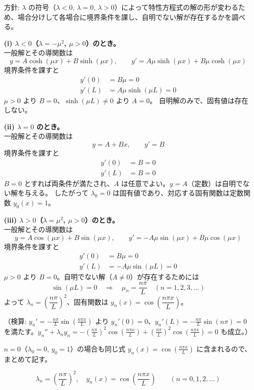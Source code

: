 
方針: $\lambda$ の符号（$\lambda < 0$, $\lambda = 0$, $\lambda > 0$）によって特性方程式の解の形が変わるため、場合分けして各場合に境界条件を課し、自明でない解が存在するかを調べる。

\textbf{(i) $\lambda < 0$（$\lambda = -\mu^{2}$, $\mu>0$）のとき。}\\
一般解とその導関数は
\[
y = A\cosh(\mu x) + B\sinh(\mu x), \qquad
y' = A\mu\sinh(\mu x) + B\mu\cosh(\mu x)
\]
境界条件を課すと
\begin{align*}
y'(0) &= B\mu = 0 \\
y'(L) &= A\mu\sinh(\mu L) = 0
\end{align*}
$\mu > 0$ より $B = 0$、$\sinh(\mu L)\neq 0$ より $A=0$。
自明解のみで、固有値は存在しない。

\textbf{(ii) $\lambda = 0$ のとき。}\\
一般解とその導関数は
\[
y = A + Bx, \qquad y' = B
\]
境界条件を課すと
\begin{align*}
y'(0) &= B = 0 \\
y'(L) &= B = 0
\end{align*}
$B = 0$ とすれば両条件が満たされ、$A$ は任意でよい。$y = A$（定数）は自明でない解を与える。
したがって $\lambda_{0} = 0$ は固有値であり、対応する固有関数は定数関数 $y_{0}(x) = 1$。

\textbf{(iii) $\lambda > 0$（$\lambda = \mu^{2}$, $\mu>0$）のとき。}\\
一般解とその導関数は
\[
y = A\cos(\mu x) + B\sin(\mu x), \qquad
y' = -A\mu\sin(\mu x) + B\mu\cos(\mu x)
\]
境界条件を課すと
\begin{align*}
y'(0) &= B\mu = 0 \\
y'(L) &= -A\mu\sin(\mu L) = 0
\end{align*}
$\mu > 0$ より $B = 0$。自明でない解（$A \neq 0$）が存在するためには
\[
\sin(\mu L) = 0 \quad\Longrightarrow\quad \mu_{n} = \frac{n\pi}{L} \quad (n = 1, 2, 3, \dots)
\]
よって $\lambda_{n} = \left(\dfrac{n\pi}{L}\right)^{2}$、固有関数は $y_{n}(x) = \cos\!\left(\dfrac{n\pi x}{L}\right)$。

（検算: $y_n' = -\frac{n\pi}{L}\sin\left(\frac{n\pi x}{L}\right)$ より $y_n'(0) = 0$、$y_n'(L) = -\frac{n\pi}{L}\sin(n\pi) = 0$ を満たす。$y_n'' + \lambda_n y_n = -\left(\frac{n\pi}{L}\right)^2\cos\left(\frac{n\pi x}{L}\right) + \left(\frac{n\pi}{L}\right)^2\cos\left(\frac{n\pi x}{L}\right) = 0$ も成立。）

$n=0$（$\lambda_0=0$, $y_0=1$）の場合も同じ式 $y_n(x)=\cos\left(\frac{n\pi x}{L}\right)$ に含まれるので、まとめて記す。

\[
\boxed{\; \lambda_{n} = \left(\frac{n\pi}{L}\right)^{2}, \quad y_{n}(x) = \cos\!\left(\frac{n\pi x}{L}\right) \qquad (n = 0, 1, 2, \dots) \;}
\]
